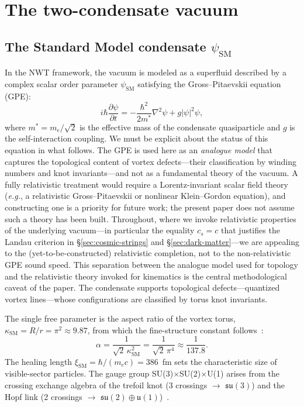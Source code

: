 \documentclass[11pt]{article}
\begin{document}
\section{The two-condensate vacuum}
\label{sec:two-condensate}

\subsection{The Standard Model condensate $\psi_\text{SM}$}

In the NWT framework, the vacuum is modeled as a superfluid described by a complex scalar order parameter $\psi_\text{SM}$ satisfying the Gross--Pitaevskii equation (GPE):
\begin{equation}
i\hbar\frac{\partial\psi}{\partial t} = -\frac{\hbar^2}{2m^*}\nabla^2\psi + g|\psi|^2\psi,
\label{eq:GPE}
\end{equation}
where $m^* = m_e/\sqrt{2}$ is the effective mass of the condensate quasiparticle and $g$ is the self-interaction coupling.
We must be explicit about the status of this equation in what follows.
The GPE is used here as an \emph{analogue model} that captures the topological content of vortex defects---their classification by winding numbers and knot invariants---and not as a fundamental theory of the vacuum.
A fully relativistic treatment would require a Lorentz-invariant scalar field theory (\emph{e.g.}, a relativistic Gross--Pitaevskii or nonlinear Klein--Gordon equation), and constructing one is a priority for future work; the present paper does not assume such a theory has been built.
Throughout, where we invoke relativistic properties of the underlying vacuum---in particular the equality $c_s = c$ that justifies the Landau criterion in \S\ref{sec:cosmic-strings} and \S\ref{sec:dark-matter}---we are appealing to the (yet-to-be-constructed) relativistic completion, not to the non-relativistic GPE sound speed.
This separation between the analogue model used for topology and the relativistic theory invoked for kinematics is the central methodological caveat of the paper.
The condensate supports topological defects---quantized vortex lines---whose configurations are classified by torus knot invariants.

The single free parameter is the aspect ratio of the vortex torus, $\kappa_\text{SM} = R/r = \pi^2 \approx 9.87$, from which the fine-structure constant follows~\cite{NWT9}:
\begin{equation}
\alpha = \frac{1}{\sqrt{2}\,\kappa_\text{SM}^2} = \frac{1}{\sqrt{2}\,\pi^4} \approx \frac{1}{137.8}.
\label{eq:alpha}
\end{equation}
The healing length $\xi_\text{SM} = \hbar/(m_e c) = 386$~fm sets the characteristic size of visible-sector particles.
The gauge group SU(3)$\times$SU(2)$\times$U(1) arises from the crossing exchange algebra of the trefoil knot (3 crossings $\to$ $\mathfrak{su}(3)$) and the Hopf link (2 crossings $\to$ $\mathfrak{su}(2) \oplus \mathfrak{u}(1)$)~\cite{NWT8}.
\end{document}
